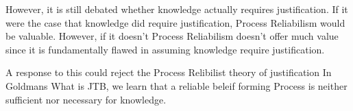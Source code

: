 \documentclass{article}
\begin{document}
However, it is still debated whether knowledge actually requires justification.
If it were the case that knowledge did require justification, Process Reliabilism
would be valuable. However, if it doesn't Process Reliabilism doesn't offer much
value since it is fundamentally flawed in assuming knowledge require justification.

A response to this could reject the Process Relibilist theory of justification
In Goldmans What is JTB, we learn that a reliable beleif forming Process
is neither sufficient nor necessary for knowledge.


\end{document}
